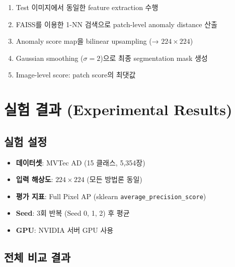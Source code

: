 \documentclass[11pt,a4paper]{article}
\begin{document}
\begin{enumerate}
  \item Test 이미지에서 동일한 feature extraction 수행
  \item FAISS를 이용한 1-NN 검색으로 patch-level anomaly distance 산출
  \item Anomaly score map을 bilinear upsampling (→ $224 \times 224$)
  \item Gaussian smoothing ($\sigma = 2$)으로 최종 segmentation mask 생성
  \item Image-level score: patch score의 최댓값
\end{enumerate}


\section{실험 결과 (Experimental Results)}

\subsection{실험 설정}

\begin{itemize}
  \item \textbf{데이터셋}: MVTec AD (15 클래스, 5,354장)
  \item \textbf{입력 해상도}: $224 \times 224$ (모든 방법론 동일)
  \item \textbf{평가 지표}: Full Pixel AP (sklearn \texttt{average\_precision\_score})
  \item \textbf{Seed}: 3회 반복 (Seed 0, 1, 2) 후 평균
  \item \textbf{GPU}: NVIDIA 서버 GPU 사용
\end{itemize}

\subsection{전체 비교 결과}
\end{document}
